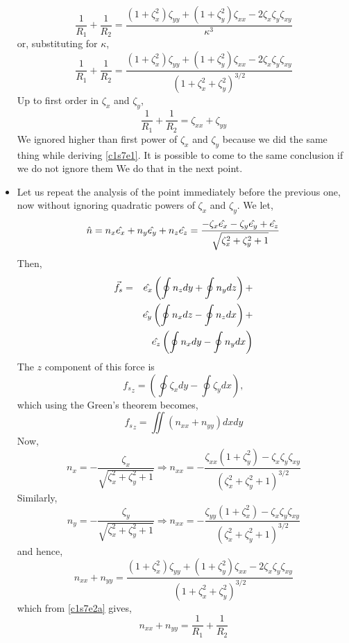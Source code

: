 \begin{itemize}
\[
\frac{1}{R_1} + \frac{1}{R_2} = \frac{(1+\zeta_x^2)\zeta_{yy} + (1+\zeta_y^2)\zeta_{xx} - 2\zeta_x\zeta_y\zeta_{xy}}{\kappa^3}
\]
or, substituting for $\kappa$,
\begin{equation}\label{c1s7e2a}
\frac{1}{R_1} + \frac{1}{R_2} = \frac{(1+\zeta_x^2)\zeta_{yy} + (1+\zeta_y^2)\zeta_{xx} - 2\zeta_x\zeta_y\zeta_{xy}}{(1 + \zeta_x^2 + \zeta_y^2)^{3/2}}
\end{equation}
Up to first order in $\zeta_x$ and $\zeta_y$,
\[
\frac{1}{R_1} + \frac{1}{R_2} = \zeta_{xx} + \zeta_{yy}
\]
We ignored higher than first power of $\zeta_x$ and $\zeta_y$ because we did the same thing while deriving \eqref{c1s7e1}. It is possible to come to the same conclusion if we do not
ignore them\cite{besant1877treatise} We do that in the next point.

\item Let us repeat the analysis of the point immediately before the previous one, now without ignoring quadratic powers of $\zeta_x$ and $\zeta_y$. We let,
\[
\hat{n} = n_x\hat{e_{x}} + n_y\hat{e_{y}} + n_z\hat{e_{z}} = \frac{-\zeta_x\hat{e_{x}} - \zeta_y\hat{e_{y}} + \hat{e_{z}}}{\sqrt{\zeta_x^2 + \zeta_y^2 + 1}}
\]
Then,
\begin{eqnarray*}
\vec{f}_s &=& \hat{e_{x}}\left(\oint n_z dy + \oint n_y dz\right) + \\
 & & \hat{e_{y}}\left(\oint n_x dz - \oint n_z dx\right) + \\
 & & \hat{e_{z}}\left(\oint n_x dy - \oint n_y dx \right)
\end{eqnarray*}
The $z$ component of this force is
\[
{f_s}_z = \left(\oint \zeta_x dy - \oint \zeta_y dx \right),
\]
which using the Green's theorem becomes,
\[
{f_s}_z = \iint (n_{xx} + n_{yy}) dxdy
\]
Now,
\[
n_x = -\frac{\zeta_x}{\sqrt{\zeta_x^2 + \zeta_y^2 + 1}} \Rightarrow n_{xx} = -\frac{\zeta_{xx}(1 + \zeta_y^2) - \zeta_x\zeta_y\zeta_{xy}}{(\zeta_x^2 + \zeta_y^2 + 1)^{3/2}}
\]
Similarly,
\[
n_y = -\frac{\zeta_y}{\sqrt{\zeta_x^2 + \zeta_y^2 + 1}} \Rightarrow n_{xx} = -\frac{\zeta_{yy}(1 + \zeta_x^2) - \zeta_x\zeta_y\zeta_{xy}}{(\zeta_x^2 + \zeta_y^2 + 1)^{3/2}}
\]
and hence,
\[
n_{xx} + n_{yy} = \frac{(1+\zeta_x^2)\zeta_{yy} + (1+\zeta_y^2)\zeta_{xx} - 2\zeta_x\zeta_y\zeta_{xy}}{(1 + \zeta_x^2 + \zeta_y^2)^{3/2}}
\]
which from \eqref{c1s7e2a} gives,
\[
n_{xx} + n_{yy} = \frac{1}{R_1} + \frac{1}{R_2}
\]


\end{itemize}
